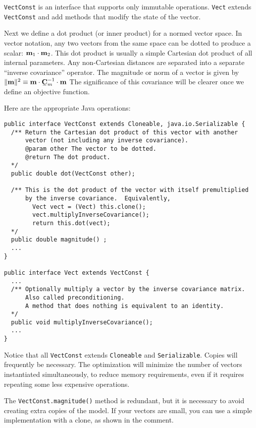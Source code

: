 \documentclass[12pt]{article}
\begin{document}
\texttt{VectConst} is an interface that
supports only immutable operations.
\texttt{Vect} extends \texttt{VectConst} and
add methods that modify the state of the
vector.

Next we define a dot product (or inner
product) for a normed vector space.  In
vector notation, any two vectors from the
same space can be dotted to produce a scalar:
${{\mbox{\boldmath $\bf m$}}}_1 \cdot {{\mbox{\boldmath $\bf m$}}}_2$.  This dot product is
usually a simple Cartesian dot product of all
internal parameters.  Any non-Cartesian
distances are separated into a separate
``inverse covariance'' operator.  The
magnitude or norm of a vector is given by $\|
\mv \|^2 \equiv \mv \cdot \Cmi \cdot \mv$ The
significance of this covariance will be
clearer once we define an objective function.

Here are the appropriate Java operations:

{\footnotesize \begin{verbatim} 
public interface VectConst extends Cloneable, java.io.Serializable {
  /** Return the Cartesian dot product of this vector with another
      vector (not including any inverse covariance).
      @param other The vector to be dotted.
      @return The dot product.
  */
  public double dot(VectConst other);

  /** This is the dot product of the vector with itself premultiplied 
      by the inverse covariance.  Equivalently,
        Vect vect = (Vect) this.clone();
        vect.multiplyInverseCovariance();
        return this.dot(vect);
  */
  public double magnitude() ;
  ...
}

public interface Vect extends VectConst {
  ...
  /** Optionally multiply a vector by the inverse covariance matrix.
      Also called preconditioning.
      A method that does nothing is equivalent to an identity.
  */
  public void multiplyInverseCovariance();
  ...
}
\end{verbatim}}

\noindent Notice that all \texttt{VectConst}
extends \texttt{Cloneable} and
\texttt{Serializable}.  Copies will
frequently be necessary.  The optimization
will minimize the number of vectors
instantiated simultaneously, to reduce memory
requirements, even if it requires repeating
some less expensive operations.

The \texttt{VectConst.magnitude()} method is
redundant, but it is necessary to avoid
creating extra copies of the model.  If your
vectors are small, you can use a simple
implementation with a clone, as shown in the
comment.
\end{document}
